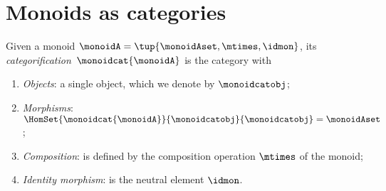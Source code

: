 
\section[Monoids as categories]{Monoids as categories}
\label{sec:monoids-as-cats}

\begin{ctdefinition}\label{def:monoidcat}
    Given a monoid $\monoidA = \tup{\monoidAset, \mtimes, \idmon}$, its \emph{categorification}~$\monoidcat{\monoidA}$ is the category with
    \begin{enumerate}
        \item \emph{Objects}: a single object, which we denote by $\monoidcatobj$;
        \item \emph{Morphisms}: $\HomSet{\monoidcat{\monoidA}}{\monoidcatobj}{\monoidcatobj} = \monoidAset$;
        \item \emph{Composition}: is defined by the composition operation $\mtimes$ of the monoid;
        \item \emph{Identity morphism}: is the neutral element $\idmon$.
    \end{enumerate}
\end{ctdefinition}

